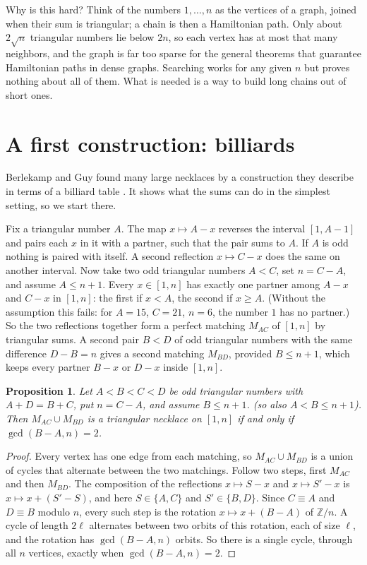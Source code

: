 \documentclass[11pt]{article}
\newtheorem{proposition}[theorem]{Proposition}
\theoremstyle{definition}
\theoremstyle{remark}
\begin{document}
Why is this hard? Think of the numbers $1,\dots,n$ as the vertices of a graph, joined when their
sum is triangular; a chain is then a Hamiltonian path. Only about $2\sqrt n$ triangular numbers lie below $2n$,
so each vertex has at most that many neighbors, and the graph is far too sparse for the general
theorems that guarantee Hamiltonian paths in dense graphs. Searching
works for any given $n$ but proves nothing about all of them. What is needed is a way to build
long chains out of short ones.

\section{A first construction: billiards}

Berlekamp and Guy found many large necklaces by a construction they describe in terms of a
billiard table \cite[p.~343]{BG}. It shows what the sums can do in the simplest setting, so we start there.

Fix a triangular number $A$. The map $x\mapsto A-x$ reverses the interval $[1,A-1]$ and pairs
each $x$ in it with a partner, such that the pair sums to $A$. If $A$ is odd nothing is paired with
itself. A second reflection $x\mapsto C-x$ does the same on another interval. Now take two
odd triangular numbers $A<C$, set $n=C-A$, and assume $A\le n+1$. Every $x\in[1,n]$ has exactly one
partner among $A-x$ and $C-x$ in $[1,n]$: the first if $x<A$, the second if $x\ge A$. (Without
the assumption this fails: for $A=15$, $C=21$, $n=6$, the number $1$ has no partner.) So the two reflections
together form a perfect matching $M_{AC}$ of $[1,n]$ by triangular sums. A second pair $B<D$ of
odd triangular numbers with the same difference $D-B=n$ gives a second matching $M_{BD}$, provided
$B\le n+1$, which keeps every partner $B-x$ or $D-x$ inside $[1,n]$.

\begin{proposition}\label{prop:billiard}
Let $A<B<C<D$ be odd triangular numbers with $A+D=B+C$, put $n=C-A$, and assume $B\le n+1$.
(so also $A<B\le n+1$). Then $M_{AC}\cup M_{BD}$ is a triangular necklace on $[1,n]$ if and only if $\gcd(B-A,n)=2$.
\end{proposition}

\begin{proof}
Every vertex has one edge from each matching, so $M_{AC}\cup M_{BD}$ is a union of cycles that
alternate between the two matchings. Follow two steps, first $M_{AC}$ and then $M_{BD}$. The
composition of the reflections $x\mapsto S-x$ and $x\mapsto S'-x$ is $x\mapsto x+(S'-S)$, and here
$S\in\{A,C\}$ and $S'\in\{B,D\}$. Since $C\equiv A$ and $D\equiv B$ modulo $n$, every such step is
the rotation $x\mapsto x+(B-A)$ of $\mathbb Z/n$. A cycle of length $2\ell$ alternates between two
orbits of this rotation, each of size $\ell$, and the rotation has $\gcd(B-A,n)$ orbits. So there is
a single cycle, through all $n$ vertices, exactly when $\gcd(B-A,n)=2$.
\end{proof}
\end{document}
